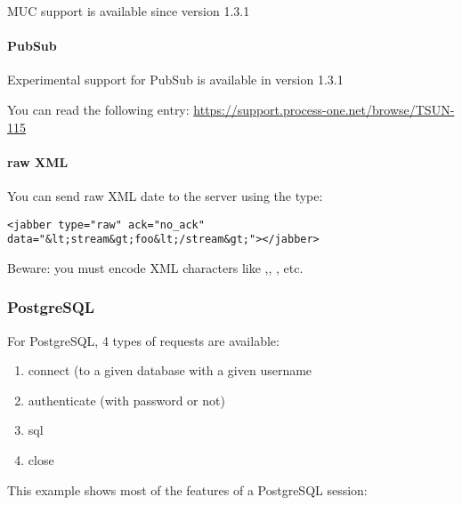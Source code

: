 \documentclass{TSUNG-en}
\begin{document}
MUC support is available since version 1.3.1

\paragraph{PubSub}

Experimental support for PubSub is available in version 1.3.1

You can read the following entry: \url{https://support.process-one.net/browse/TSUN-115}


\paragraph{raw XML}
You can send raw XML date to the server using the  type:
\begin{Verbatim}
<jabber type="raw" ack="no_ack" data="&lt;stream&gt;foo&lt;/stream&gt;"></jabber>
\end{Verbatim}

Beware: you must encode XML characters like \userinput{<}
,\userinput{>}, \userinput{\&}, etc.

\subsubsection{PostgreSQL}

For PostgreSQL, 4 types of requests are available:
\begin{enumerate}
\item connect (to a given database with a given username
\item authenticate (with password or not)
\item sql
\item close
\end{enumerate}

This example shows most of the features of a PostgreSQL session:
\end{document}
